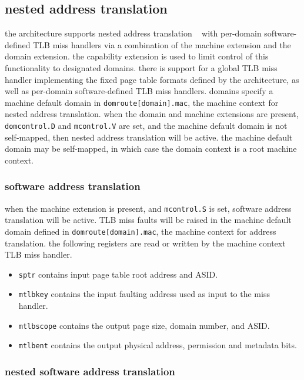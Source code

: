 \newpage
\subsection{nested address translation}

the architecture supports nested address translation%
~\cite{popek1974virtualization} with per-domain
software-defined TLB miss handlers via a combination of the machine
extension and the domain extension. the capability extension is used to
limit control of this functionality to designated domains.
there is support for a global TLB miss handler implementing the
fixed page table formats defined by the architecture, as well as per-domain
software-defined TLB miss handlers.
\para
domains specify a machine default domain in \texttt{domroute[domain].mac},
the machine context for nested address translation.
when the domain and machine extensions are present,
\texttt{domcontrol.D} and \texttt{mcontrol.V} are set, and the
machine default domain is not self-mapped, then nested address
translation will be active. the machine default domain may be
self-mapped, in which case the domain context is a root machine context.

\subsubsection{software address translation}

when the machine extension is present, and \texttt{mcontrol.S} is set,
software address translation will be active. TLB miss faults will be
raised in the machine default domain defined in \texttt{domroute[domain].mac},
the machine context for address translation.
\para
the following registers are read or written by the machine context TLB miss handler.

\begin{itemize}[itemsep=0pt]
\item \texttt{sptr} contains input page table root address and ASID.
\item \texttt{mtlbkey} contains the input faulting address used as input to the miss handler.
\item \texttt{mtlbscope} contains the output page size, domain number, and ASID.
\item \texttt{mtlbent} contains the output physical address, permission and metadata bits.
\end{itemize}

\subsubsection{nested software address translation}


